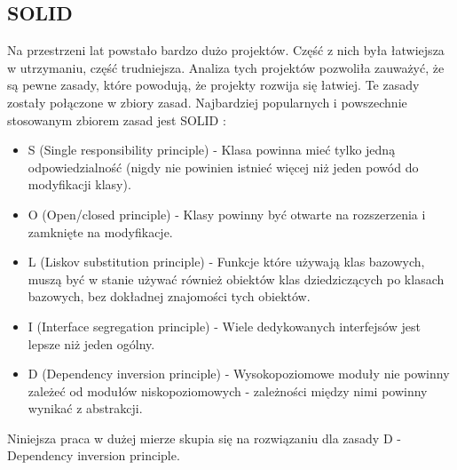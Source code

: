 \documentclass[12pt]{article}
\begin{document}
\subsection{SOLID}
Na przestrzeni lat powstało bardzo dużo projektów. Część z nich była łatwiejsza w utrzymaniu, część trudniejsza. Analiza tych projektów pozwoliła zauważyć, że są pewne zasady, które powodują, że projekty rozwija się łatwiej. Te zasady zostały połączone w zbiory zasad. Najbardziej popularnych i powszechnie stosowanym zbiorem zasad jest SOLID \cite{SOLID}:
\begin{itemize}
	\item S (Single responsibility principle) - Klasa powinna mieć tylko jedną odpowiedzialność (nigdy nie powinien istnieć więcej niż jeden powód do modyfikacji klasy).
	\item O (Open/closed principle) - Klasy powinny być otwarte na rozszerzenia i zamknięte na modyfikacje.
	\item L (Liskov substitution principle) - Funkcje które używają klas bazowych, muszą być w stanie używać również obiektów klas dziedziczących po klasach bazowych, bez dokładnej znajomości tych obiektów.
	\item I (Interface segregation principle) - Wiele dedykowanych interfejsów jest lepsze niż jeden ogólny.
	\item D (Dependency inversion principle) - Wysokopoziomowe moduły nie powinny zależeć od modułów niskopoziomowych - zależności między nimi powinny wynikać z abstrakcji.
\end{itemize}
Niniejsza praca w dużej mierze skupia się na rozwiązaniu dla zasady D - Dependency inversion principle. 
\end{document}
